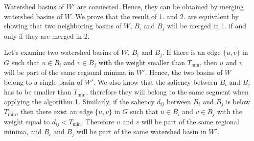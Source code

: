 \documentclass[10pt, conference, compsocconf]{IEEEtran}
\begin{document}
Watershed basins of $W'$ are connected. Hence, they can be obtained by
merging watershed basins of $W$. We prove that the result of 1. and
2. are equivalent by showing that two neighboring basins of $W$, $B_i$
and $B_j$ will be merged in 1. if and only if they are merged in 2.

Let's examine two watershed basins of $W$, $B_i$ and $B_j$. If there
is an edge $\{u,v\}$ in $G$ such that $u \in B_i$ and $v \in B_j$ with
the weight smaller than $T_{\min}$, then $u$ and $v$ will be part of
the same regional minima in $W'$. Hence, the two basins of $W$ belong
to a single basin of $W'$. We also know that the saliency between
$B_i$ and $B_j$ has to be smaller than $T_{\min}$, therefore they will
belong to the same segment when applying the algorithm 1. Similarly,
if the saliency $d_{ij}$ between $B_i$ and $B_j$ is below $T_{\min}$,
then there exist an edge $\{u,v\}$ in $G$ such that $u \in B_i$ and $v
\in B_j$ with the weight equal to $d_{ij} < T_{\min}$. Therefore $u$
and $v$ will be part of the same regional minima, and $B_i$ and $B_j$
will be part of the same watershed basin in $W'$.



{\small


}
\end{document}
